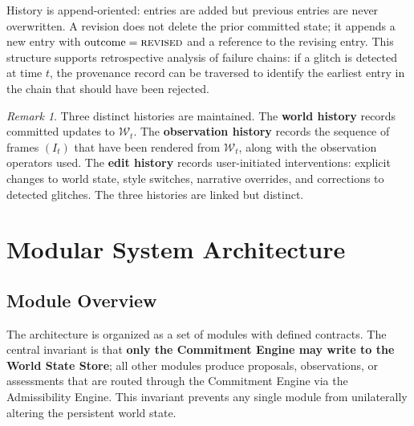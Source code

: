\documentclass[11pt,a4paper]{article}
\theoremstyle{plain}
\theoremstyle{definition}
\theoremstyle{remark}
\newtheorem{remark}[theorem]{Remark}
\begin{document}
History is append-oriented: entries are added but previous entries are never overwritten. A revision does not delete the prior committed state; it appends a new entry with $\mathrm{outcome} = \textsc{revised}$ and a reference to the revising entry. This structure supports retrospective analysis of failure chains: if a glitch is detected at time $t$, the provenance record can be traversed to identify the earliest entry in the chain that should have been rejected.

\begin{remark}
Three distinct histories are maintained. The \textbf{world history} records committed updates to $\mathcal{W}_t$. The \textbf{observation history} records the sequence of frames $(I_t)$ that have been rendered from $\mathcal{W}_t$, along with the observation operators used. The \textbf{edit history} records user-initiated interventions: explicit changes to world state, style switches, narrative overrides, and corrections to detected glitches. The three histories are linked but distinct.
\end{remark}


\section{Modular System Architecture}
\label{sec:architecture}

\subsection{Module Overview}

The architecture is organized as a set of modules with defined contracts. The central invariant is that \textbf{only the Commitment Engine may write to the World State Store}; all other modules produce proposals, observations, or assessments that are routed through the Commitment Engine via the Admissibility Engine. This invariant prevents any single module from unilaterally altering the persistent world state.
\end{document}
